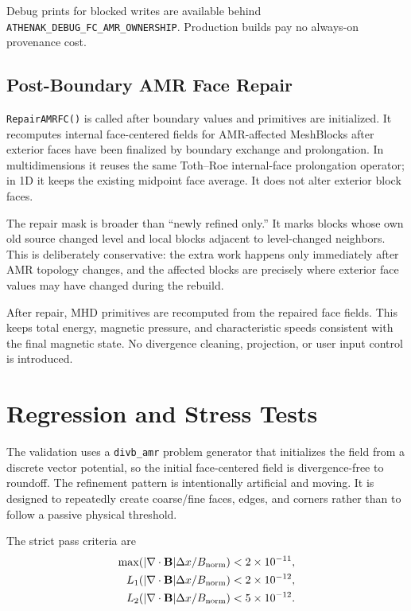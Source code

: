 \documentclass[11pt]{article}
\newcommand{\code}[1]{\texttt{#1}}
\newcommand{\Ndiv}{|\nabla\cdot\mathbf{B}|\Delta x/B_{\rm norm}}
\begin{document}
Debug prints for blocked writes are available behind
\code{ATHENAK\_DEBUG\_FC\_AMR\_OWNERSHIP}.  Production builds pay no always-on
provenance cost.

\subsection{Post-Boundary AMR Face Repair}

\code{RepairAMRFC()} is called after boundary values and primitives are
initialized.  It recomputes internal face-centered fields for AMR-affected
MeshBlocks after exterior faces have been finalized by boundary exchange and
prolongation.  In multidimensions it reuses the same Toth--Roe internal-face
prolongation operator; in 1D it keeps the existing midpoint face average.  It
does not alter exterior block faces.

The repair mask is broader than ``newly refined only.''  It marks blocks whose
own old source changed level and local blocks adjacent to level-changed
neighbors.  This is deliberately conservative: the extra work happens only
immediately after AMR topology changes, and the affected blocks are precisely
where exterior face values may have changed during the rebuild.

After repair, MHD primitives are recomputed from the repaired face fields.  This
keeps total energy, magnetic pressure, and characteristic speeds consistent with
the final magnetic state.  No divergence cleaning, projection, or user input
control is introduced.

\section{Regression and Stress Tests}

The validation uses a \code{divb\_amr} problem generator that initializes the
field from a discrete vector potential, so the initial face-centered field is
divergence-free to roundoff.  The refinement pattern is intentionally artificial
and moving.  It is designed to repeatedly create coarse/fine faces, edges, and
corners rather than to follow a passive physical threshold.

The strict pass criteria are
\begin{align}
  \max(\Ndiv) &< 2\times10^{-11},\\
  L_1(\Ndiv) &< 2\times10^{-12},\\
  L_2(\Ndiv) &< 5\times10^{-12}.
\end{align}
\end{document}
